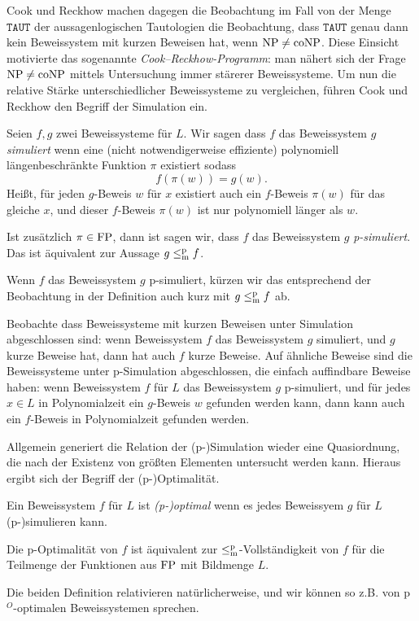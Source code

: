 Cook und Reckhow machen dagegen die Beobachtung im Fall von der Menge $\mathtt{TAUT}$ der aussagenlogischen Tautologien die Beobachtung, dass $\mathtt{TAUT}$ genau dann kein Beweissystem mit kurzen Beweisen hat, wenn $\mathrm{NP}\neq\mathrm{coNP}$.
Diese Einsicht motivierte das sogenannte \emph{Cook–Reckhow-Programm}: man nähert sich der Frage  $\mathrm{NP}\neq \mathrm{coNP}$ mittels Untersuchung immer stärerer Beweissysteme.
Um nun die relative Stärke unterschiedlicher Beweissysteme zu vergleichen, führen Cook und Reckhow den Begriff der Simulation ein.
\begin{definition}
    Seien $f,g$ zwei Beweissysteme für $L$. Wir sagen dass $f$ das Beweissystem $g$ \emph{simuliert} wenn eine (nicht notwendigerweise effiziente) polynomiell längenbeschränkte Funktion $\pi$  existiert sodass 
    \[ f(\pi(w))=g(w). \]
    Heißt, für jeden $g$-Beweis $w$ für $x$ existiert auch ein $f$-Beweis $\pi(w)$ für das gleiche $x$, und dieser $f$-Beweis $\pi(w)$ ist nur polynomiell länger als $w$.

    Ist zusätzlich $\pi\in\mathrm{FP}$, dann ist sagen wir, dass $f$ das Beweissystem $g$ \emph{p-simuliert}. Das ist äquivalent zur Aussage $g \leq_\mathrm{m}^\mathrm{p} f$.
\end{definition}
Wenn $f$ das Beweissystem $g$ p-simuliert, kürzen wir das entsprechend der Beobachtung in der Definition auch kurz mit $g\leq_\mathrm{m}^\mathrm{p} f$ ab.

Beobachte dass Beweissysteme mit kurzen Beweisen unter Simulation abgeschlossen sind: wenn Beweissystem $f$ das Beweissystem $g$ simuliert, und $g$ kurze Beweise hat, dann hat auch $f$ kurze Beweise. 
Auf ähnliche Beweise sind die Beweissysteme unter p-Simulation abgeschlossen, die einfach auffindbare Beweise haben:  wenn Beweissystem $f$ für $L$ das Beweissystem $g$ p-simuliert, und für jedes $x\in L$ in Polynomialzeit ein $g$-Beweis $w$ gefunden werden kann, dann kann auch ein $f$-Beweis in Polynomialzeit gefunden werden.

Allgemein generiert die Relation der (p-)Simulation wieder eine Quasiordnung, die nach der Existenz von größten  Elementen untersucht werden kann. 
Hieraus ergibt sich der Begriff der (p-)Optimalität.
\begin{definition}
    Ein Beweissystem $f$ für $L$ ist \emph{(p-)optimal} wenn es jedes Beweissyem $g$ für $L$ (p-)simulieren kann.

    Die p-Optimalität von $f$ ist äquivalent zur $\leq_\mathrm{m}^\mathrm{p}$-Vollständigkeit von $f$ für die Teilmenge der Funktionen aus $\mathrm{FP}$ mit Bildmenge $L$.
\end{definition}
Die beiden Definition relativieren natürlicherweise, und wir können so z.B. von p${}^O$-optimalen Beweissystemen sprechen.

